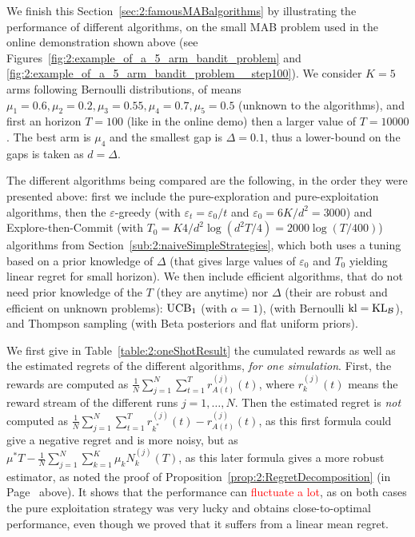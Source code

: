 
We finish this Section~\ref{sec:2:famousMABalgorithms} by illustrating the performance of different algorithms, on the small MAB problem used in the online demonstration shown above (see Figures~\ref{fig:2:example_of_a_5_arm_bandit_problem} and \ref{fig:2:example_of_a_5_arm_bandit_problem__step100}).
We consider $K=5$ arms following Bernoulli distributions, of means $\mu_1=0.6,\mu_2=0.2,\mu_3=0.55,\mu_4=0.7,\mu_5=0.5$ (unknown to the algorithms), and first an horizon $T=100$ (like in the online demo) then a larger value of $T=10000$.
The best arm is $\mu_4$ and the smallest gap is $\Delta = 0.1$, thus a lower-bound on the gaps is taken as $d=\Delta$.

The different algorithms being compared are the following, in the order they were presented above:
%
first we include the pure-exploration and
pure-exploitation algorithms,
then the $\varepsilon$-greedy (with $\varepsilon_t=\varepsilon_0/t$ and $\varepsilon_0=6K/d^2=3000$) and
Explore-then-Commit (with $T_0=K4/d^2 \log(d^2T/4)=2000\log(T/400)$) algorithms
from Section~\ref{sub:2:naiveSimpleStrategies}, which both uses a tuning based on a prior knowledge of $\Delta$ (that gives large values of $\varepsilon_0$ and $T_0$ yielding linear regret for small horizon).
%
We then include efficient algorithms, that do not need prior knowledge of the $T$ (they are anytime) nor $\Delta$ (their are robust and efficient on unknown problems):
$\mathrm{UCB}_1$ (with $\alpha=1$),
\klUCB{} (with Bernoulli $\mathrm{kl} = \mathrm{KL}_{\mathcal{B}}$),
and Thompson sampling (with Beta posteriors and flat uniform priors).
%

We first give in Table~\ref{table:2:oneShotResult} the cumulated rewards as well as the estimated regrets of the different algorithms, \emph{for one simulation}.
First, the rewards are computed as $\frac{1}{N} \sum_{j=1}^N \sum_{t=1}^T r^{(j)}_{A(t)}(t)$, where $r^{(j)}_{k}(t)$ means the reward stream of the different runs $j=1,\dots,N$. Then the estimated regret is \emph{not} computed as $\frac{1}{N} \sum_{j=1}^N \sum_{t=1}^T r^{(j)}_{k^*}(t) - r^{(j)}_{A(t)}(t)$, as this first formula could give a negative regret and is more noisy, but as $\mu^* T - \frac{1}{N} \sum_{j=1}^N \sum_{k=1}^K \mu_k N^{(j)}_{k}(T)$, as this later formula gives a more robust estimator, as noted the proof of Proposition~\ref{prop:2:RegretDecomposition} (in Page~\pageref{remark:2:moreAccurateCountofRegretForSimulations} above).
%
It shows that the performance can \textcolor{red}{fluctuate a lot}, as on both cases the pure exploitation strategy was very lucky and obtains close-to-optimal performance, even though we proved that it suffers from a linear mean regret.

